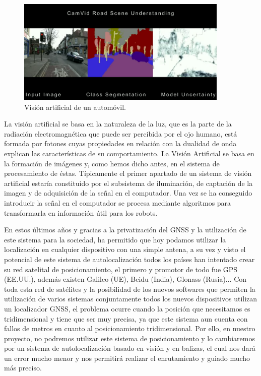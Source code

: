 \begin{figure}[H]
	\begin{center}
		\includegraphics[width=0.9\textwidth]{imag/IMG4.png}
				\caption{Visión artificial de un automóvil.}
	\label{fig:Vista artificial automoviles.}	
	\end{center}
\end{figure}

\hspace{1cm} La visión artificial se basa en la naturaleza de la luz, que es la parte de la radiación electromagnética que puede ser percibida por el ojo humano, está formada por fotones cuyas propiedades en relación con la dualidad de onda explican las características de su comportamiento. La Visión Artificial se basa en la formación de imágenes y, como hemos dicho antes, en el sistema de procesamiento de éstas. Típicamente el primer apartado de un sistema de visión artificial estaría constituido  por  el  subsistema  de  iluminación,  de  captación  de  la  imagen  y  de adquisición  de  la  señal  en  el  computador. Una vez se ha conseguido introducir la señal en el computador se procesa mediante algoritmos para transformarla en información útil para los robots.

\hspace{1cm} En estos últimos años y gracias a la privatización del GNSS y la utilización de este sistema para la sociedad, ha permitido que hoy podamos utilizar la localización en cualquier dispositivo con una simple antena, a su vez y visto el potencial de este sistema de autolocalización todos los países han intentado crear su red satelital de posicionamiento, el primero y promotor de todo fue GPS (EE.UU.), además existen Galileo (UE), Beidu (India), Glonass (Rusia)... Con toda esta red de satélites y la posibilidad de los nuevos softwares que permiten la utilización de varios sistemas conjuntamente todos los nuevos dispositivos utilizan un localizador GNSS, el problema ocurre cuando la posición que necesitamos es tridimensional y tiene que ser muy precisa, ya que este sistema aun cuenta con fallos de metros en cuanto al posicionamiento tridimensional. Por ello, en nuestro proyecto, no podremos utilizar este sistema de posicionamiento y lo cambiaremos por un sistema de autolocalización basado en visión y en balizas, el cual nos dará un error mucho menor y nos permitirá realizar el enrutamiento y guiado mucho más preciso.
\\
\\
\\
\\

